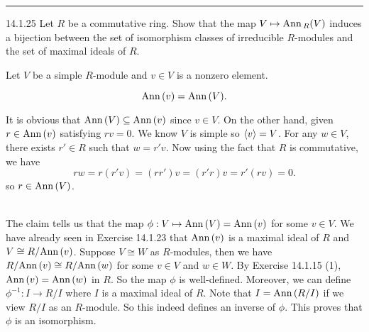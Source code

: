 \documentclass[a4paper, 12pt]{article}
\begin{document}
\noindent\rule{7in}{2.8pt}
\newpage
\begin{problem}{14.1.25}
Let \(R\) be a commutative ring. Show that the map \(V\mapsto \text{Ann}\,_R(V)\) induces a bijection between the set of isomorphism classes of irreducible \(R\)-modules and 
the set of maximal ideals of \(R\).
\end{problem}
\begin{solution}
Let \(V\) be a simple \(R\)-module and \(v\in V\) is a nonzero element. 

\begin{claim}
\[\text{Ann}\,(v)=\text{Ann}\,(V).\]
\end{claim}
\begin{claimproof}
It is obvious that \(\text{Ann}\,(V)\subseteq \text{Ann}\,(v)\) since \(v\in V\). On the other hand, given \(r\in \text{Ann}\,(v)\) satisfying \(rv=0\). We know \(V\) is simple so \(\langle v\rangle =V\). For any \(w\in V\), there exists 
\(r'\in R\) such that \(w=r'v\). Now using the fact that \(R\) is commutative, we have 
\[rw=r(r'v)=(rr')v=(r'r)v=r'(rv)=0.\]
so \(r\in \text{Ann}\,(V)\).
\end{claimproof}\\
The claim tells us that the map \(\phi:V\mapsto \text{Ann}\,(V)=\text{Ann}\,(v)\) for some \(v\in V\). We have already seen in Exercise 14.1.23 that \(\text{Ann}\,(v)\) is a maximal ideal of \(R\) and \(V\cong R/\text{Ann}\,(v)\). Suppose \(V\cong W\) as \(R\)-modules, then we have 
\(R/\text{Ann}\,(v)\cong R/\text{Ann}\,(w)\) for some \(v\in V\) and \(w\in W\). By Exercise 14.1.15 (1), \(\text{Ann}\,(v)=\text{Ann}\,(w)\) in \(R\). So the map \(\phi\) is well-defined. Moreover, we can define \(\phi^{-1}:I\rightarrow R/I\) where \(I\) is a maximal ideal of \(R\). Note that 
\(I=\text{Ann}\,(R/I)\) if we view \(R/I\) as an \(R\)-module. So this indeed defines an inverse of \(\phi\). This proves that \(\phi\) is an isomorphism.  
\end{solution}
\end{document}
